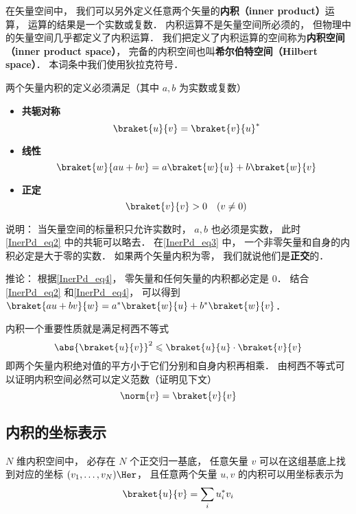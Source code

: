 

在矢量空间中， 我们可以另外定义任意两个矢量的\textbf{内积（inner product）}运算， 运算的结果是一个实数或复数． 内积运算不是矢量空间所必须的， 但物理中的矢量空间几乎都定义了内积运算． 我们把定义了内积运算的空间称为\textbf{内积空间（inner product space）}， 完备的内积空间也叫\textbf{希尔伯特空间（Hilbert space）}． 本词条中我们使用狄拉克符号．

两个矢量内积的定义必须满足（其中 $a, b$ 为实数或复数）

\begin{itemize}
\item \textbf{共轭对称}
\begin{equation}\label{InerPd_eq2}
\braket{u}{v} = \braket{v}{u}^*
\end{equation}
\item \textbf{线性}
\begin{equation}\label{InerPd_eq4}
\braket{w}{a u + b v} = a\braket{w}{u} + b\braket{w}{v}
\end{equation}
\item \textbf{正定}
\begin{equation}\label{InerPd_eq3}
\braket{v}{v} > 0 \quad (v \ne 0)
\end{equation}
\end{itemize}

说明： 当矢量空间的标量积只允许实数时， $a, b$ 也必须是实数， 此时\autoref{InerPd_eq2} 中的共轭可以略去． 在\autoref{InerPd_eq3} 中， 一个非零矢量和自身的内积必定是大于零的实数． 如果两个矢量内积为零， 我们就说他们是\textbf{正交}的．

推论： 根据\autoref{InerPd_eq4}， 零矢量和任何矢量的内积都必定是 0． 结合\autoref{InerPd_eq2} 和\autoref{InerPd_eq4}， 可以得到 $\braket{a u + b v}{w} = a^*\braket{w}{u} + b^*\braket{w}{v}$．

内积一个重要性质就是满足柯西不等式
\begin{equation}
\abs{\braket{u}{v}}^2 \leqslant \braket{u}{u} \cdot \braket{v}{v}
\end{equation}
即两个矢量内积绝对值的平方小于它们分别和自身内积再相乘． 由柯西不等式可以证明内积空间必然可以定义范数（证明见下文）
\begin{equation}
\norm{v} = \braket{v}{v}
\end{equation}

\subsection{内积的坐标表示}
$N$ 维内积空间中， 必存在 $N$ 个正交归一基底， 任意矢量 $v$ 可以在这组基底上找到对应的坐标 $(v_1, \dots, v_N)\Her$， 且任意两个矢量 $u, v$ 的内积可以用坐标表示为
\begin{equation}
\braket{u}{v} = \sum_i u_i^* v_i
\end{equation}

